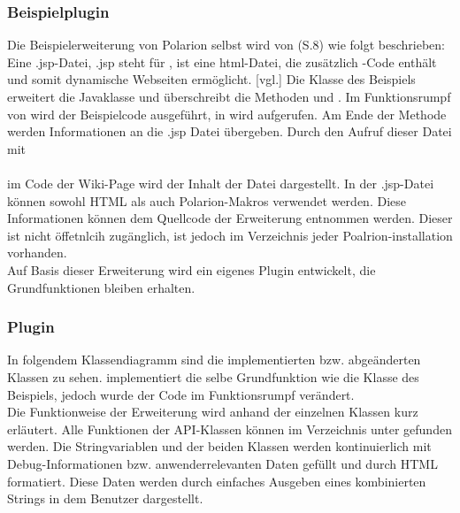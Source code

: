 \subsubsection{Beispielplugin }
\label{sub:beispiel}
Die Beispielerweiterung von Polarion selbst wird von \cite{17}(S.8) wie folgt beschrieben: \\
Eine \glq.jsp\grq{}-Datei, \glq.jsp\grq{} steht für , ist eine \ac{html}-Datei, die zusätzlich -Code enthält und somit dynamische Webseiten ermöglicht. \cite{21}[vgl.]
Die Klasse des Beispiels erweitert die Javaklasse  und überschreibt die Methoden  und . Im Funktionsrumpf von  wird der Beispielcode ausgeführt, in  wird  aufgerufen. Am Ende der  Methode werden Informationen an die \glq.jsp\grq{} Datei übergeben. Durch den Aufruf dieser Datei mit \\  \\ im Code der Wiki-Page wird der Inhalt der Datei  dargestellt. In der \glq.jsp\grq{}-Datei können sowohl HTML als auch Polarion-Makros verwendet werden. Diese Informationen können dem Quellcode der Erweiterung entnommen werden. Dieser ist nicht öffetnlcih zugänglich, ist jedoch im Verzeichnis jeder Poalrion-installation vorhanden.\\
Auf Basis dieser Erweiterung wird ein eigenes Plugin entwickelt, die  Grundfunktionen bleiben erhalten.
\newpage
\subsubsection{Plugin }
\label{sub:workitemmul}
In folgendem Klassendiagramm sind die implementierten bzw. abgeänderten Klassen zu sehen.  implementiert die selbe Grundfunktion wie die Klasse des Beispiels, jedoch wurde der Code im  Funktionsrumpf verändert.\\
\newpage
Die Funktionweise der Erweiterung wird anhand der einzelnen Klassen kurz erläutert. Alle Funktionen der API-Klassen können im Verzeichnis unter \cite{19} gefunden  werden. Die Stringvariablen  und  der beiden Klassen werden kontinuierlich mit Debug-Informationen bzw. anwenderrelevanten Daten gefüllt und durch HTML formatiert. Diese Daten werden durch einfaches Ausgeben eines kombinierten Strings in  dem Benutzer dargestellt.
